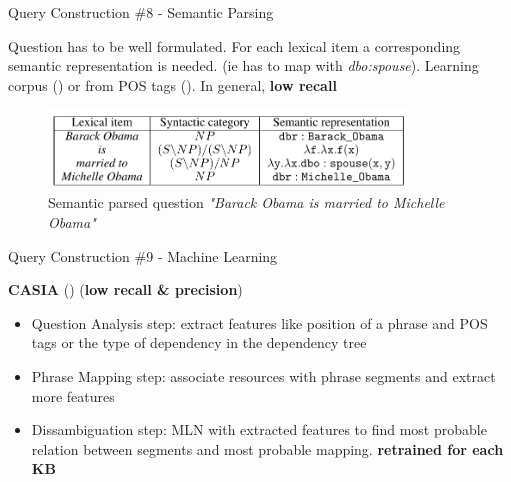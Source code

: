 \documentclass{beamer}
\begin{document}
\begin{frame}{Query Construction \#8 - Semantic Parsing}
  \begin{cardTiny}
    Question has to be well formulated. For each lexical item a corresponding semantic representation is needed. (ie  has to map with \textit{dbo:spouse}). Learning corpus (\cite{hakimov2015a}) or from POS tags (\cite{unger2012a}). In general, \textbf{low recall}
  \end{cardTiny}
  \begin{cardTiny}
    \begin{figure}\label{fig:semantic_query}
      \centering
      \includegraphics[width=0.85\textwidth]{./res/semantic_query.png}
      \caption{Semantic parsed question \textit{"Barack Obama is married to Michelle Obama"}}
    \end{figure}
  \end{cardTiny}
\end{frame}

\begin{frame}{Query Construction \#9 - Machine Learning}
  \begin{card}
    \textbf{CASIA} (\cite{he2014a}) (\textbf{low recall \& precision})
    \begin{itemize}
      \item Question Analysis step: extract features like position of a phrase and POS tags or the type of dependency in the dependency tree 
      \item Phrase Mapping step: associate resources with phrase segments and extract more features
      \item Dissambiguation step: MLN with extracted features to find most probable relation between segments and most probable mapping. \textbf{retrained for each KB}
    \end{itemize}
  \end{card}
\end{frame}
\end{document}
